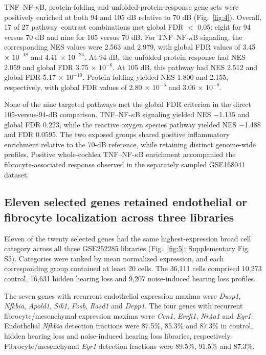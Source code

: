 TNF--NF-\(\kappa\)B, protein-folding and unfolded-protein-response gene sets were positively enriched at both 94 and 105 dB relative to 70 dB (Fig.~\ref{fig:4}). Overall, 17 of 27 pathway--contrast combinations met global FDR \(<\) 0.05: eight for 94 versus 70 dB and nine for 105 versus 70 dB. For TNF--NF-\(\kappa\)B signaling, the corresponding NES values were 2.563 and 2.979, with global FDR values of 3.45 \(\times\) \(10^{-18}\) and 4.41 \(\times\) \(10^{-24}\). At 94 dB, the unfolded protein response had NES 2.059 and global FDR 3.75 \(\times\) \(10^{-6}\). At 105 dB, this pathway had NES 2.512 and global FDR 5.17 \(\times\) \(10^{-10}\). Protein folding yielded NES 1.800 and 2.155, respectively, with global FDR values of 2.80 \(\times\) \(10^{-5}\) and 3.06 \(\times\) \(10^{-8}\).

None of the nine targeted pathways met the global FDR criterion in the direct 105-versus-94-dB comparison. TNF--NF-\(\kappa\)B signaling yielded NES \(-\)1.135 and global FDR 0.223, while the reactive oxygen species pathway yielded NES \(-\)1.488 and FDR 0.0595. The two exposed groups shared positive inflammatory enrichment relative to the 70-dB reference, while retaining distinct genome-wide profiles. Positive whole-cochlea TNF--NF-\(\kappa\)B enrichment accompanied the fibrocyte-associated response observed in the separately sampled GSE168041 dataset.

\subsection{Eleven selected genes retained endothelial or fibrocyte localization across three libraries}

Eleven of the twenty selected genes had the same highest-expression broad cell category across all three GSE252285 libraries (Fig.~\ref{fig:5}; Supplementary Fig. S5). Categories were ranked by mean normalized expression, and each corresponding group contained at least 20 cells. The 36,111 cells comprised 10,273 control, 16,631 hidden hearing loss and 9,207 noise-induced hearing loss profiles.

The seven genes with recurrent endothelial expression maxima were \mbox{\textit{Dusp1}}, \mbox{\textit{Nfkbia}}, \mbox{\textit{Apold1}}, \mbox{\textit{Sik1}}, \mbox{\textit{Fosb}}, \mbox{\textit{Rasd1}} and \mbox{\textit{Depp1}}. The four genes with recurrent fibrocyte/\allowbreak{}mesenchymal expression maxima were \mbox{\textit{Ccn1}}, \mbox{\textit{Errfi1}}, \mbox{\textit{Nr4a1}} and \mbox{\textit{Egr1}}. Endothelial \mbox{\textit{Nfkbia}} detection fractions were 87.5\%, 85.3\% and 87.3\% in control, hidden hearing loss and noise-induced hearing loss libraries, respectively. Fibrocyte/\allowbreak{}mesenchymal \mbox{\textit{Egr1}} detection fractions were 89.5\%, 91.5\% and 87.3\%.

